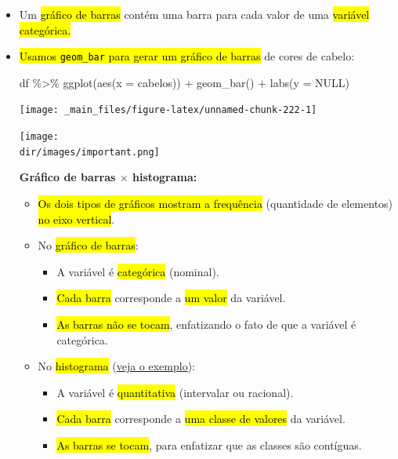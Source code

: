 \documentclass[
  11pt]{report}
\newenvironment{Shaded}{\begin{snugshade}}{\end{snugshade}}
\newcommand{\AttributeTok}[1]{\textcolor[rgb]{0.77,0.63,0.00}{#1}}
\newcommand{\ConstantTok}[1]{\textcolor[rgb]{0.00,0.00,0.00}{#1}}
\newcommand{\FunctionTok}[1]{\textcolor[rgb]{0.00,0.00,0.00}{#1}}
\newcommand{\NormalTok}[1]{#1}
\newcommand{\SpecialCharTok}[1]{\textcolor[rgb]{0.00,0.00,0.00}{#1}}
\newcommand{\dir}{/ssd/R/x86_64-pc-linux-gnu-library/4.3/fnaufelRmd/rmarkdown/resources}
\newenvironment{rmdimportant}
{
  \begin{myimportant}
    \texttt{[image: \\dir/images/important.png]}
    \tcblower
  }
  {
  \end{myimportant}
}
\renewenvironment{Shaded}{
    \begin{mdframed}[%
      roundcorner=2pt,%
      innerleftmargin=5pt,%
      innerrightmargin=5pt,%
      topline=true,%
      leftline=true,%
      rightline=true,%
      bottomline=true,%
      linewidth=0.5pt,%
      linecolor=black!20,%
      backgroundcolor=black!2,%
      skipabove=2ex,%
      skipbelow=2.5ex%
    ]%
  }
  {
    \end{mdframed}
  }
\begin{document}
\begin{itemize}
\item
  Um {\hl{gráfico de barras}} contém uma barra para cada valor de uma {\hl{variável categórica.}}
\item
  {\hl{Usamos {\mbox{\texttt{geom\_bar}}} para gerar um gráfico de barras}} de cores de cabelo:

\begin{Shaded}
\begin{Highlighting}[]
\NormalTok{df }\SpecialCharTok{\%\textgreater{}\%} 
  \FunctionTok{ggplot}\NormalTok{(}\FunctionTok{aes}\NormalTok{(}\AttributeTok{x =}\NormalTok{ cabelos)) }\SpecialCharTok{+}
    \FunctionTok{geom\_bar}\NormalTok{() }\SpecialCharTok{+}
    \FunctionTok{labs}\NormalTok{(}\AttributeTok{y =} \ConstantTok{NULL}\NormalTok{)}
\end{Highlighting}
\end{Shaded}

  \begin{center}\texttt{[image: \_main\_files/figure-latex/unnamed-chunk-222-1]} \end{center}

  \begin{rmdimportant}

  \textbf{Gráfico de barras $\times$ histograma:}

  \begin{itemize}
  \item
    {\hl{Os dois tipos de gráficos mostram a frequência}} (quantidade de elementos) {\hl{no eixo vertical}}.
  \item
    No {\hl{gráfico de barras}}:

    \begin{itemize}
    \item
      A variável é {\hl{categórica}} (nominal).
    \item
      {\hl{Cada barra}} corresponde a {\hl{um valor}} da variável.
    \item
      {\hl{As barras não se tocam}}, enfatizando o fato de que a variável é categórica.
    \end{itemize}
  \item
    No {\hl{histograma}} (\protect\hyperlink{histograma1}{veja o exemplo}):

    \begin{itemize}
    \item
      A variável é {\hl{quantitativa}} (intervalar ou racional).
    \item
      {\hl{Cada barra}} corresponde a {\hl{uma classe de valores}} da variável.
    \item
      {\hl{As barras se tocam}}, para enfatizar que as classes são contíguas.
    \end{itemize}
  \end{itemize}


\end{rmdimportant}
\end{itemize}
\end{document}
